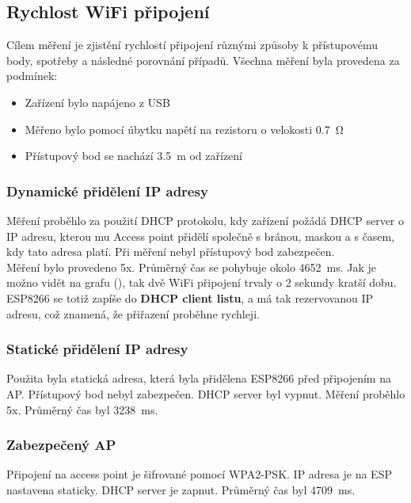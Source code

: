 \documentclass[a4paper, 12pt]{report}
\begin{document}
			\subsection{Rychlost WiFi připojení}
				Cílem měření je zjistění rychlostí připojení různými způsoby k přístupovému body, spotřeby a následné porovnání případů. Všechna měření byla provedena za podmínek:

				\begin{itemize}
					\item Zařízení bylo napájeno z USB
					\item Měřeno bylo pomocí úbytku napětí na rezistoru o velokosti \SI{0,7}{\ohm}
					\item Přístupový bod se nachází \SI{3,5}{m} od zařízení
				\end{itemize}

				\subsubsection{Dynamické přidělení IP adresy}
					Měření proběhlo za použití DHCP protokolu, kdy zařízení požádá DHCP server o IP adresu, kterou mu Access point přidělí společně s bránou, maskou a s časem, kdy tato adresa platí. Při měření nebyl přístupový bod zabezpečen.\\
					Měření bylo provedeno 5x. Průměrný čas se pohybuje okolo \SI{4652}{ms}. Jak je možno vidět na grafu (), tak dvě WiFi připojení trvaly o 2 sekundy kratší dobu. ESP8266 se totiž zapíše do \textbf{DHCP client listu}, a má tak rezervovanou IP adresu, což znamená, že přiřazení proběhne rychleji.

				\subsubsection{Statické přidělení IP adresy}
					Použita byla statická adresa, která byla přidělena ESP8266 před připojením na AP. Přístupový bod nebyl zabezpečen. DHCP server byl vypnut.
					Měření proběhlo 5x. Průměrný čas byl \SI{3238}{ms}.\\

				\subsubsection{Zabezpečený AP}
						Připojení na access point je šifrované pomocí WPA2-PSK. IP adresa je na ESP nastavena staticky. DHCP server je zapnut.
						Průměrný čas byl \SI{4709}{ms}.\\
\end{document}
